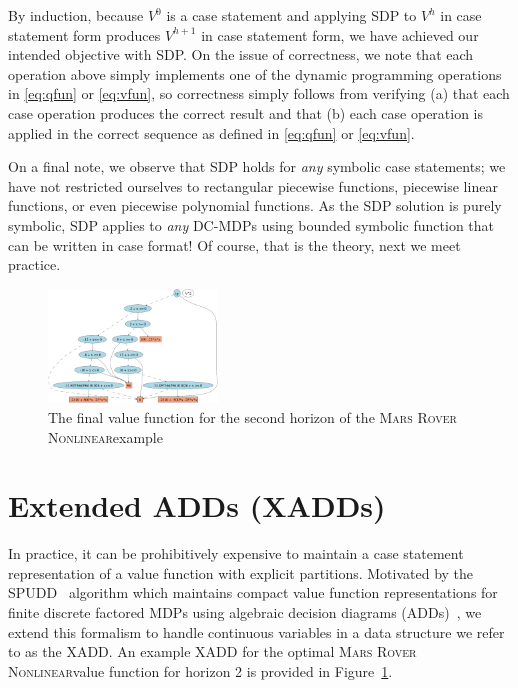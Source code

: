 \documentclass[letterpaper]{article}
\newcommand{\MarsRoverNL}{\textsc{Mars Rover Nonlinear}}
\begin{document}
By induction, because $V^0$ is a case statement and applying
SDP to $V^h$ in case statement form produces $V^{h+1}$ in case
statement form, we have achieved our intended
objective with SDP.  On the issue of correctness,
we note that each operation above simply implements one of the
dynamic programming operations in \eqref{eq:qfun} or \eqref{eq:vfun}, 
so correctness simply follows from verifying (a) that each case
operation produces the correct result and that (b) each case operation
is applied in the correct sequence as defined in \eqref{eq:qfun} or 
\eqref{eq:vfun}.  


On a final note, we observe that SDP holds for \emph{any} symbolic
case statements; we have not restricted ourselves to rectangular
piecewise functions, piecewise linear functions, or even piecewise
polynomial functions.  As the SDP solution is purely symbolic,
SDP applies to \emph{any} DC-MDPs using bounded symbolic function 
that can be written in case format!  Of course, that is the theory,
next we meet practice.


\begin{figure}[t]
\begin{center}
\includegraphics[width=0.4\textwidth]{Figures1/v2.pdf}
\end{center}
\vspace{-3mm}
\caption{%
The final value function for the second horizon of the \MarsRoverNL example\
} \label{fig:rover_V2}
\vspace{-3mm}
\end{figure}

\section{Extended ADDs (XADDs)}

In practice, it can be prohibitively expensive to maintain
a case statement representation of a value function with explicit
partitions.  Motivated by the SPUDD~\cite{spudd} algorithm which
maintains compact value function representations for finite discrete
factored MDPs using algebraic decision diagrams (ADDs)~\cite{bahar93add},
we extend this formalism to handle continuous variables in a data
structure we refer to as the XADD.  An example XADD for the optimal
\MarsRoverNL value function for horizon 2 is provided
in Figure~\ref{fig:rover_V2}.
\end{document}
